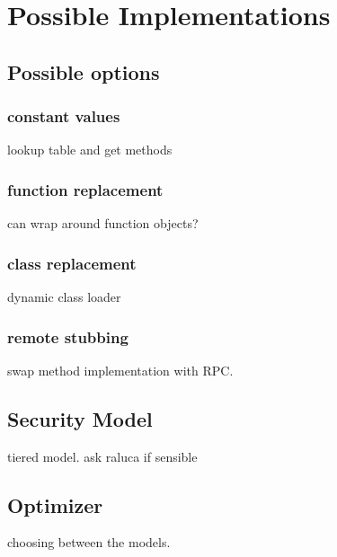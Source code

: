 \section{Possible Implementations}

\subsection{Possible options}

\subsubsection{constant values}

lookup table and get methods

\subsubsection{function replacement}

can wrap around function objects?

\subsubsection{class replacement}

dynamic class loader

\subsubsection{remote stubbing}

swap method implementation with RPC.

\subsection{Security Model}

tiered model.  ask raluca if sensible

\subsection{Optimizer}

choosing between  the models.

